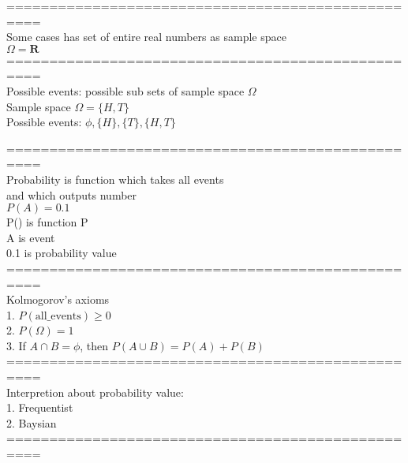 \documentclass{article}
\begin{document}
================================================== \\
Some cases has set of entire real numbers as sample space \\ 
$\Omega = \mathbf{R}$ \\ 

================================================== \\
Possible events: possible sub sets of sample space $\Omega$ \\ 

Sample space $\Omega=\{H,T\}$ \\ 
Possible events: $\phi,\{H\},\{T\},\{H,T\}$

================================================== \\
Probability is function which takes all events \\
and which outputs number \\ 

$P(A)=0.1$ \\
P() is function P \\
A is event \\
0.1 is probability value \\

================================================== \\
Kolmogorov's axioms \\ 

1. $P(\text{all\_events})\ge 0$ \\ 
2. $P(\Omega)=1$ \\ 
3. If $A\cap B=\phi$, then $P(A\cup B)=P(A)+P(B)$ \\ 

================================================== \\
Interpretion about probability value: \\ 
1. Frequentist \\ 
2. Baysian \\ 

================================================== \\
\end{document}
